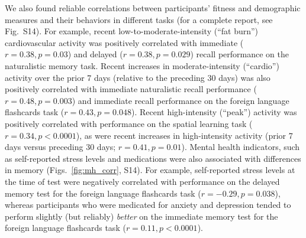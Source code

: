 \documentclass[10pt]{article}
\newcommand{\allCorr}{S14}
\begin{document}
We also found reliable correlations between participants' fitness and
demographic measures and their behaviors in different tasks
(for a complete report, see Fig.~\allCorr).  For example, recent
low-to-moderate-intensity (``fat burn'') 
cardiovascular activity was positively
correlated with immediate ($r = 0.38, p = 0.03$) and delayed ($r =
0.38, p = 0.029$) recall performance on the naturalistic
memory task.  Recent increases in moderate-intensity (``cardio'')
activity over the prior 7 days (relative to the preceding 30 days) was
also positively correlated with immediate naturalistic recall
performance ($r =
0.48, p = 0.003$) and immediate recall performance on the foreign language
flashcards task ($r = 0.43, p = 0.048$).  Recent high-intensity
(``peak'') activity was positively correlated with performance on the
spatial learning task ($r = 0.34, p < 0.0001$), as were recent increases
in high-intensity activity (prior 7 days versus preceding 30 days; $r
= 0.41, p = 0.01$).  Mental health indicators, such as self-reported
stress levels and medications were also associated with differences in
memory (Figs.~\ref{fig:mh_corr}, \allCorr).  For example, self-reported stress levels at the time of test
were negatively correlated with performance on the delayed memory test
for the foreign language flashcards task ($r = -0.29, p = 0.038$),
whereas participants who were medicated for anxiety and depression
tended to perform slightly (but reliably) \textit{better} on the immediate memory test for the
foreign language flashcards task ($r = 0.11, p < 0.0001$).
\end{document}

